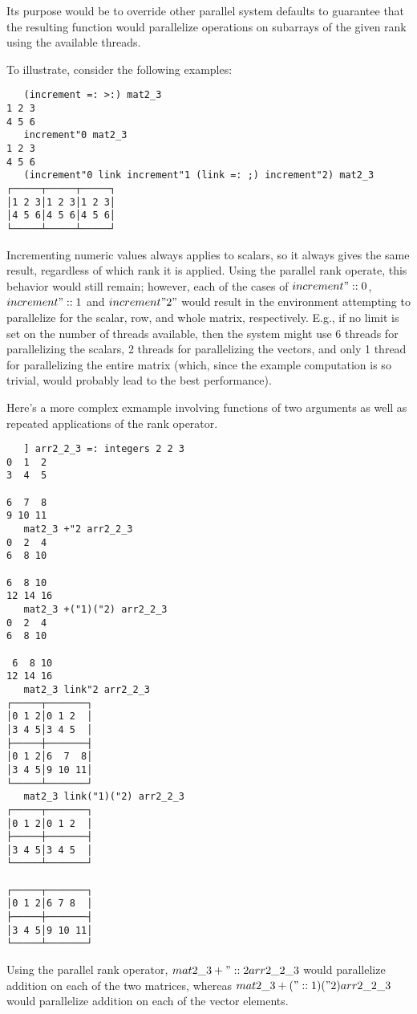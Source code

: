 Its purpose would be to override other parallel system defaults 
to guarantee that the resulting function would parallelize operations on subarrays of the given rank 
using the available threads.

To illustrate, consider the following examples:

\begin{verbatim}
   (increment =: >:) mat2_3
1 2 3
4 5 6
   increment"0 mat2_3
1 2 3
4 5 6
   (increment"0 link increment"1 (link =: ;) increment"2) mat2_3
┌─────┬─────┬─────┐
│1 2 3│1 2 3│1 2 3│
│4 5 6│4 5 6│4 5 6│
└─────┴─────┴─────┘
\end{verbatim}

Incrementing numeric values always applies to scalars, so it always gives the same result, 
regardless of which rank it is applied. 
Using the parallel rank operate, this behavior would still remain; 
however, each of the cases of $increment"::0$, $increment"::1$ and $increment"2"$ 
would result in the environment attempting to parallelize for the scalar, row, and whole matrix, respectively.
E.g., if no limit is set on the number of threads available, 
then the system might use 6 threads for parallelizing the scalars, 
2 threads for parallelizing the vectors, 
and only 1 thread for parallelizing the entire matrix 
(which, since the example computation is so trivial, would probably lead to the best performance).

Here's a more complex exmample involving functions of two arguments 
as well as repeated applications of the rank operator.

\begin{verbatim}
   ] arr2_2_3 =: integers 2 2 3
0  1  2
3  4  5

6  7  8
9 10 11
   mat2_3 +"2 arr2_2_3
0  2  4
6  8 10

6  8 10
12 14 16
   mat2_3 +("1)("2) arr2_2_3
0  2  4
6  8 10

 6  8 10
12 14 16
   mat2_3 link"2 arr2_2_3
┌─────┬───────┐
│0 1 2│0 1 2  │
│3 4 5│3 4 5  │
├─────┼───────┤
│0 1 2│6  7  8│
│3 4 5│9 10 11│
└─────┴───────┘
   mat2_3 link("1)("2) arr2_2_3
┌─────┬───────┐
│0 1 2│0 1 2  │
├─────┼───────┤
│3 4 5│3 4 5  │
└─────┴───────┘

┌─────┬───────┐
│0 1 2│6 7 8  │
├─────┼───────┤
│3 4 5│9 10 11│
└─────┴───────┘
\end{verbatim}

Using the parallel rank operator, 
$mat2\_3 +"::2 arr2\_2\_3$ would parallelize addition on each of the two matrices, whereas
$mat2\_3 +("::1)("2) arr2\_2\_3$ would parallelize addition on each of the vector elements.

